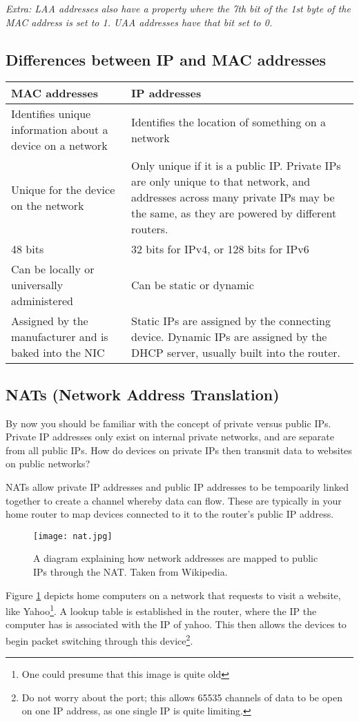 \documentclass[../main.tex]{subfiles}
\begin{document}
\emph{Extra: LAA addresses also have a property where the 7th bit of the 1st byte of the MAC address is set to 1. UAA addresses have that bit set to 0.}

\subsection{Differences between IP and MAC addresses}

\begin{longtable}{|p{}|p{}|}
    \hline 
    \textbf{MAC addresses} & \textbf{IP addresses}
    \\ \hline
Identifies unique information about a device on a network & Identifies the location of something on a network
    \\ \hline
    Unique for the device on the network & Only unique if it is a public IP. Private IPs are only unique to that network, and addresses across many private IPs may be the same, as they are powered by different routers.
    \\ \hline
    48 bits & 32 bits for IPv4, or 128 bits for IPv6
    \\ \hline
    Can be locally or universally administered & Can be static or dynamic
    \\ \hline
    Assigned by the manufacturer and is baked into the NIC & Static IPs are assigned by the connecting device. Dynamic IPs are assigned by the DHCP server, usually built into the router.
    \\ \hline
\end{longtable}

\subsection{NATs (Network Address Translation)}
\label{2:sec:nats}

By now you should be familiar with the concept of private versus public IPs. Private IP addresses only exist on internal private networks, and are separate from all public IPs. How do devices on private IPs then transmit data to websites on public networks?

NATs allow private IP addresses and public IP addresses to be tempoarily linked together to create a channel whereby data can flow. These are typically in your home router to map devices connected to it to the router's public IP address.

\begin{figure}[h]
    \centering
    \texttt{[image: nat.jpg]}
    \caption{A diagram explaining how network addresses are mapped to public IPs through the NAT. Taken from Wikipedia.}
    \label{fig:nat}
\end{figure}

Figure \ref{fig:nat} depicts home computers on a network that requests to visit a website, like Yahoo\footnote{One could presume that this image is quite old}. A lookup table is established in the router, where the IP the computer has is associated with the IP of yahoo. This then allows the devices to begin packet switching through this device\footnote{Do not worry about the port; this allows 65535 channels of data to be open on one IP address, as one single IP is quite limiting.}.
\end{document}
